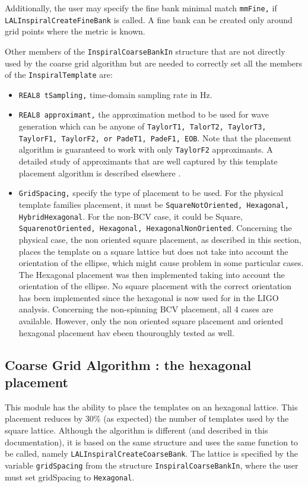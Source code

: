 Additionally, the user may specify the fine bank minimal match
\texttt{mmFine,} if \texttt{LALInspiralCreateFineBank} is called.
A fine bank can be created only around grid points where the
metric is known.

Other members of the \texttt{InspiralCoarseBankIn} structure that
are not directly used by the coarse grid algorithm but are needed to
correctly set all the members of the \texttt{InspiralTemplate} are:

\begin{itemize}
\item \texttt {REAL8 tSampling,} time-domain sampling rate in Hz.
\item \texttt {REAL8 approximant,} the approximation method to be used
for wave generation which can be anyone of \texttt{TaylorT1, TalorT2,
TaylorT3, TaylorF1, TaylorF2, {\rm or} PadeT1, PadeF1, EOB}. Note that
the placement algorithm is guaranteed to work with only \texttt {TaylorF2}
approximants. A detailed study of approximants that are well captured by
this template placement algorithm is described elsewhere \cite{Sathyaprakash
2001a}.
\item \texttt {GridSpacing,} specify the type of placement to be used. For the
physical template families placement, it must be \texttt{SquareNotOriented,
Hexagonal, HybridHexagonal}. For the non-BCV case, it could be Square,
\texttt{SquarenotOriented, Hexagonal, HexagonalNonOriented}. Concerning
the physical case, the non oriented square placement, as described in this
section, places the template on a square lattice but does not take into
account the orientation of the ellipse, which might cause problem in some
particular cases. The Hexagonal placement was then implemented taking  into
account the orientation of the ellipse. No square placement with the correct
orientation has been implemented since the hexagonal is now used for in the
LIGO analysis. Concerning the non-spinning BCV placement, all 4 cases are
available. However, only the non oriented square placement and oriented
hexagonal placement hav ebeen thouroughly tested as well.

\end{itemize}

\subsection{Coarse Grid Algorithm : the hexagonal placement}
This module has the ability to place the templates on an hexagonal lattice.
This placement reduces by 30\% (as expected) the number of templates used by
the square lattice. Although the algorithm is different (and described in this
documentation), it is based on the same structure and uses the same function
to be called, namely \texttt{LALInspiralCreateCoarseBank}. The lattice is
specified by the variable \texttt{gridSpacing} from the structure \texttt{InspiralCoarseBankIn}, where
the user must set gridSpacing to \texttt{Hexagonal}.

